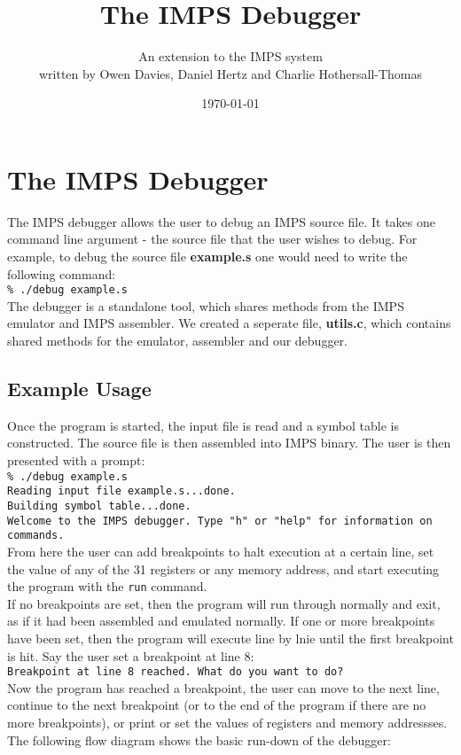 \documentclass[11pt]{report}
\begin{document}
\setlength{\topmargin}{-1cm} %

\title{The IMPS Debugger}
\author{An extension to the IMPS system\\written by Owen Davies, Daniel Hertz and Charlie Hothersall-Thomas}
\date{ \today}

\maketitle
\section*{The IMPS Debugger} %

The IMPS debugger allows the user to debug an IMPS source file. It takes one 
command line argument - the source file that the user wishes to debug. For 
example, to debug the source file \textbf{example.s} one would need to write 
the following command:
\\[1ex]
\texttt{\% ./debug example.s}
\\[1ex]
The debugger is a standalone tool, which shares methods from the IMPS emulator 
and IMPS assembler. We created a seperate file, \textbf{utils.c}, which contains 
shared methods for the emulator, assembler and our debugger.

\subsection*{Example Usage}

Once the program is started, the input file is read and a symbol table is 
constructed. The source file is then assembled into IMPS binary. The user is 
then presented with a prompt:
\\[1ex]
\texttt{\% ./debug example.s\\
		Reading input file example.s...done.\\
		Building symbol table...done.\\
		Welcome to the IMPS debugger. Type "h" or "help" for information on commands.}
\\[1ex]
From here the user can add breakpoints to halt execution at a certain line, set 
the value of any of the 31 registers or any memory address, and start executing 
the program with the \texttt{run} command.\\
If no breakpoints are set, then the program will run through normally and exit, 
as if it had been assembled and emulated normally. If one or more breakpoints 
have been set, then the program will execute line by lnie until the first 
breakpoint is hit. Say the user set a breakpoint at line 8:
\\[1ex]
\texttt{Breakpoint at line 8 reached. What do you want to do?}
\\[1ex]
Now the program has reached a breakpoint, the user can move to the next line, 
continue to the next breakpoint (or to the end of the program if there are no 
more breakpoints), or print or set the values of registers and memory 
addressses.
\newpage
The following flow diagram shows the basic run-down of the debugger:
\end{document}

